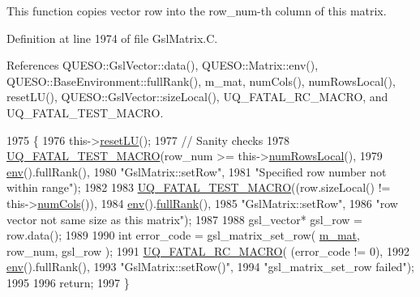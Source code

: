 This function copies vector {\ttfamily row} into the row\-\_\-num-\/th column of {\ttfamily this} matrix. 



Definition at line 1974 of file Gsl\-Matrix.\-C.



References Q\-U\-E\-S\-O\-::\-Gsl\-Vector\-::data(), Q\-U\-E\-S\-O\-::\-Matrix\-::env(), Q\-U\-E\-S\-O\-::\-Base\-Environment\-::full\-Rank(), m\-\_\-mat, num\-Cols(), num\-Rows\-Local(), reset\-L\-U(), Q\-U\-E\-S\-O\-::\-Gsl\-Vector\-::size\-Local(), U\-Q\-\_\-\-F\-A\-T\-A\-L\-\_\-\-R\-C\-\_\-\-M\-A\-C\-R\-O, and U\-Q\-\_\-\-F\-A\-T\-A\-L\-\_\-\-T\-E\-S\-T\-\_\-\-M\-A\-C\-R\-O.


\begin{DoxyCode}
1975 \{
1976   this->\hyperlink{class_q_u_e_s_o_1_1_gsl_matrix_ab55ec308530e4135a719181a6351840c}{resetLU}();
1977   \textcolor{comment}{// Sanity checks}
1978   \hyperlink{_defines_8h_a56d63d18d0a6d45757de47fcc06f574d}{UQ\_FATAL\_TEST\_MACRO}(row\_num >= this->\hyperlink{class_q_u_e_s_o_1_1_gsl_matrix_ab5ec937a9fd439eef1a87e12c0dbccb4}{numRowsLocal}(),
1979                       \hyperlink{class_q_u_e_s_o_1_1_matrix_a1eefeca9f35200e8275fb0fdfa0c8684}{env}().fullRank(),
1980                       \textcolor{stringliteral}{"GslMatrix::setRow"},
1981                       \textcolor{stringliteral}{"Specified row number not within range"});
1982 
1983   \hyperlink{_defines_8h_a56d63d18d0a6d45757de47fcc06f574d}{UQ\_FATAL\_TEST\_MACRO}((row.sizeLocal() != this->\hyperlink{class_q_u_e_s_o_1_1_gsl_matrix_ad5005f168fe030468e834776afb1859b}{numCols}()),
1984                       \hyperlink{class_q_u_e_s_o_1_1_matrix_a1eefeca9f35200e8275fb0fdfa0c8684}{env}().\hyperlink{class_q_u_e_s_o_1_1_base_environment_a84a239e42ae443cf71db6e03e8159620}{fullRank}(),
1985                       \textcolor{stringliteral}{"GslMatrix::setRow"},
1986                       \textcolor{stringliteral}{"row vector not same size as this matrix"});
1987 
1988   gsl\_vector* gsl\_row = row.data();
1989 
1990   \textcolor{keywordtype}{int} error\_code = gsl\_matrix\_set\_row( \hyperlink{class_q_u_e_s_o_1_1_gsl_matrix_a2cac0bd065e280a06445f944d5f3e3b3}{m\_mat}, row\_num, gsl\_row );
1991   \hyperlink{_defines_8h_aa9107e1a9a5197371a412db3fa349988}{UQ\_FATAL\_RC\_MACRO}( (error\_code != 0),
1992                      \hyperlink{class_q_u_e_s_o_1_1_matrix_a1eefeca9f35200e8275fb0fdfa0c8684}{env}().fullRank(),
1993                      \textcolor{stringliteral}{"GslMatrix::setRow()"},
1994                      \textcolor{stringliteral}{"gsl\_matrix\_set\_row failed"});
1995 
1996   \textcolor{keywordflow}{return};
1997 \}
\end{DoxyCode}
